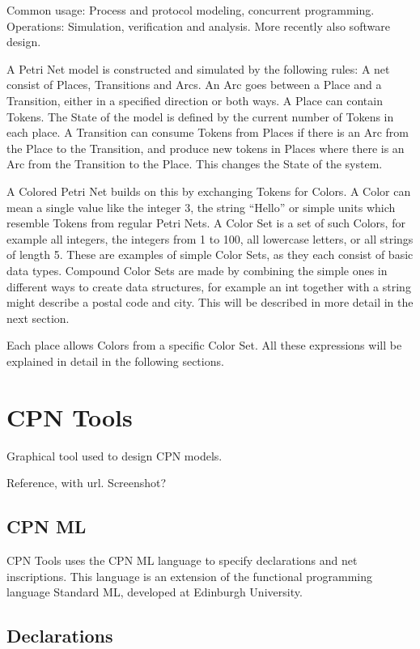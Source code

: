 Common usage: Process and protocol modeling, concurrent programming. Operations:
Simulation, verification and analysis. More recently also software design.


A Petri Net model is constructed and simulated by the following rules: A net
consist of Places, Transitions and Arcs. An Arc goes between a Place and a
Transition, either in a specified direction or both ways. A Place can contain
Tokens. The State of the model is defined by the current number of Tokens in
each place. A Transition can consume Tokens from Places if there is an Arc from
the Place to the Transition, and produce new tokens in Places where there is an
Arc from the Transition to the Place. This changes the State of the system.

A Colored Petri Net builds on this by exchanging Tokens for Colors.
A Color can mean a single value like the integer 3, the string ``Hello'' or
simple units which resemble Tokens from regular Petri Nets. A Color Set is a
set of such Colors, for example all integers, the integers from 1 to 100, all
lowercase letters, or all strings of length 5. These are examples of simple
Color Sets, as they each consist of basic data types. Compound Color Sets are
made by combining the simple ones in different ways to create data structures, for
example an int together with a string might describe a postal code and city.
This will be described in more detail in the next section.

Each place allows Colors from a specific Color Set. 
All these expressions will be explained in detail in the following sections.

\section{CPN Tools}

Graphical tool used to design CPN models. 

Reference, with url. Screenshot?

\subsection{CPN ML}
	
	CPN Tools uses the CPN ML language to specify declarations and net inscriptions.
	This language is an extension of the functional programming language Standard
	ML, developed at Edinburgh University.

\subsection{Declarations}
	
